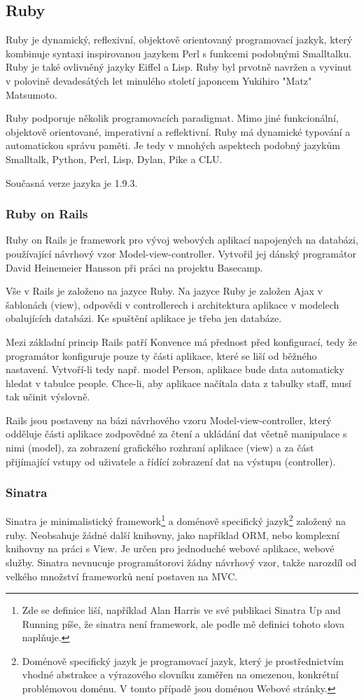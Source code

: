 \subsection{Ruby}
Ruby je dynamický, reflexivní, objektově orientovaný programovací jazkyk, který kombinuje syntaxi inspirovanou jazykem Perl s funkcemi podobnými Smalltalku. Ruby je také ovlivněný jazyky Eiffel a Lisp. Ruby byl prvotně navržen a vyvinut v polovině devadesátých let minulého století japoncem Yukihiro "Matz" Matsumoto.

Ruby podporuje několik programovacích paradigmat. Mimo jiné funkcionální, objektově orientované, imperativní a reflektivní. Ruby má dynamické typování a automatickou správu paměti. Je tedy v mnohých aspektech podobný jazykům Smalltalk, Python, Perl, Lisp, Dylan, Pike a CLU.

Současná verze jazyka je 1.9.3.
\subsubsection{Ruby on Rails}
Ruby on Rails je framework pro vývoj webových aplikací napojených na databázi, používající návrhový vzor Model-view-controller. Vytvořil jej dánský programátor David Heinemeier Hansson při práci na projektu Basecamp.

Vše v Rails je založeno na jazyce Ruby. Na jazyce Ruby je založen Ajax v šablonách (view), odpovědi v controllerech i architektura aplikace v modelech obalujících databázi. Ke spuštění aplikace je třeba jen databáze.

Mezi základní princip Rails patří Konvence má přednost před konfigurací, tedy že programátor konfiguruje pouze ty části aplikace, které se liší od běžného nastavení. Vytvoří-li tedy např. model Person, aplikace bude data automaticky hledat v tabulce people. Chce-li, aby aplikace načítala data z tabulky staff, musí tak učinit výslovně.

Rails jsou postaveny na bázi návrhového vzoru Model-view-controller, který odděluje části aplikace zodpovědné za čtení a ukládání dat včetně manipulace s nimi (model), za zobrazení grafického rozhraní aplikace (view) a za část přijímající vstupy od uživatele a řídící zobrazení dat na výstupu (controller).

\subsubsection{Sinatra}
Sinatra je minimalistický framework\footnote{Zde se definice liší, například Alan Harris ve své publikaci Sinatra Up and Running píše, že sinatra není framework, ale podle mě definici tohoto slova naplňuje.} a doménově specifický jazyk\footnote{Doménově specifický jazyk je programovací jazyk, který je prostřednictvím vhodné abstrakce a výrazového slovníku zaměřen na omezenou, konkrétní problémovou doménu. V tomto případě jsou doménou Webové stránky.} založený na ruby. Neobsahuje žádné další knihovny, jako například ORM, nebo komplexní knihovny na práci s View. Je určen pro jednoduché webové aplikace, webové služby. Sinatra nevnucuje programátorovi žádny návrhový vzor, takže narozdíl od velkého množství frameworků není postaven na MVC.\cite{harris2011sinatra}

